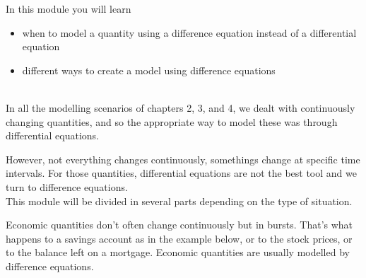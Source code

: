 In this module you will learn
\begin{itemize}
	\item when to model a quantity using a difference equation instead of a differential equation
	\item different ways to create a model using difference equations
\end{itemize}

\hfill \\

In all the modelling scenarios of chapters 2, 3, and 4, we dealt with continuously changing quantities, and so the appropriate way to model these was through differential equations.

However, not everything changes continuously, somethings change at specific time intervals. For those quantities, differential equations are not the best tool and we turn to difference equations. \\

This module will be divided in several parts depending on the type of situation. \\





Economic quantities don't often change continuously but in bursts. That's what happens to a savings account as in the example below, or to the stock prices, or to the balance left on a mortgage.
Economic quantities are usually modelled by difference equations.


